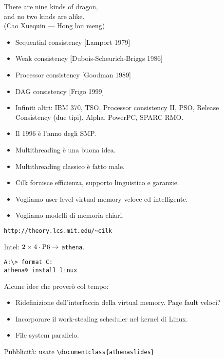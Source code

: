\documentclass[times,sans-serif]{athenaslides}
\begin{document}
\begin{slide}
  \begin{smaller}
    {
      \hbox{}\hfill There are nine kinds of dragon, \\
      \hbox{}\hfill and no two kinds are alike. \\
      }
    \hbox{}\hfill\sf (Cao Xuequin --- Hong lou meng)
  \end{smaller}

  \begin{itemize}
  \item {\Red Sequential consistency} [Lamport 1979]
  \item {\Red Weak consistency} [Dubois-Scheurich-Briggs 1986]
  \item {\Red Processor consistency} [Goodman 1989]
  \item {\Red DAG consistency} [Frigo 1999]
  \item {\Red Infiniti altri}: IBM 370, TSO, Processor consistency II,
    PSO, Release Consistency (due tipi), Alpha, PowerPC, SPARC RMO.
  \end{itemize}
\end{slide}
\begin{slide}[Conclusioni]
  \begin{itemize}
  \item Il 1996 \`e l'anno degli SMP.
  \item Multithreading \`e una buona idea.
  \item Multithreading classico \`e fatto male.
  \item Cilk fornisce efficienza, supporto linguistico e garanzie.
  \item Vogliamo user-level virtual-memory veloce ed intelligente.
  \item Vogliamo modelli di memoria chiari.
  \end{itemize}
    
  \smallskip
  \centerline{\texttt{http://theory.lcs.mit.edu/\textasciitilde{}cilk}}
\end{slide}
\begin{slide}
  Intel:  $2 \times 4 \cdot \hbox{P6} \rightarrow$ \texttt{athena}.

  \noindent\verb|A:\> format C:| \\
  \noindent\verb|athena% install linux|

  Alcune idee che prover\`o col tempo:

  \begin{itemize}
  \item Ridefinizione dell'interfaccia della virtual memory.
    Page fault veloci?
  \item Incorporare il work-stealing scheduler nel kernel di Linux.
  \item File system parallelo.
  \end{itemize}

  \begin{Red}
    Pubblicit\`a: usate \verb|\documentclass{athenaslides}|
  \end{Red}
\end{slide}
\end{document}
